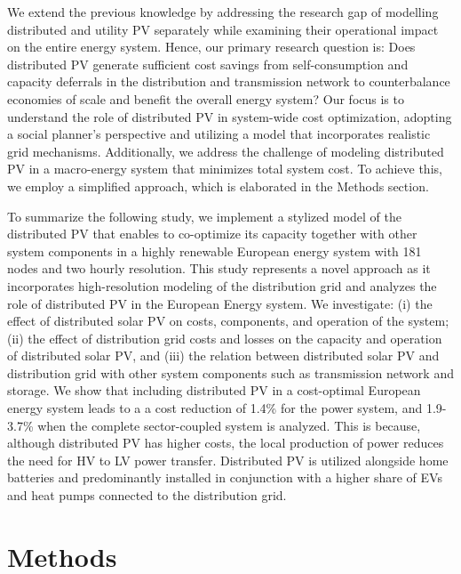 \documentclass[review]{elsarticle}
\begin{document}
We extend the previous knowledge by addressing the research gap of modelling distributed and utility PV separately while examining their operational impact on the entire energy system. Hence, our primary research question is: Does distributed PV generate sufficient cost savings from self-consumption and capacity deferrals in the distribution and transmission network to counterbalance economies of scale and benefit the overall energy system? Our focus is to understand the role of distributed PV in system-wide cost optimization, adopting a social planner's perspective and utilizing a model that incorporates realistic grid mechanisms. Additionally, we address the challenge of modeling distributed PV in a macro-energy system that minimizes total system cost. To achieve this, we employ a simplified approach, which is elaborated in the Methods section.

To summarize the following study, we implement a stylized model of the distributed PV that enables to co-optimize its capacity together with other system components in a highly renewable European energy system with 181 nodes and two hourly resolution. This study represents a novel approach as it incorporates high-resolution modeling of the distribution grid and analyzes the role of distributed PV in the European Energy system. We investigate: (i) the effect of distributed solar PV on costs, components, and operation of the system; (ii) the effect of distribution grid costs and losses on the capacity and operation of distributed solar PV, and (iii) the relation between distributed solar PV and distribution grid with other system components such as transmission network and storage. We show that including distributed PV in a cost-optimal European energy system leads to a a cost reduction of 1.4\% for the power system, and 1.9-3.7\% when the complete sector-coupled system is analyzed. This is because, although distributed PV has higher costs, the local production of power reduces the need for HV to LV power transfer. Distributed PV is utilized alongside home batteries and predominantly installed in conjunction with a  higher share of EVs and heat pumps connected to the distribution grid.


\section{Methods}
\end{document}
